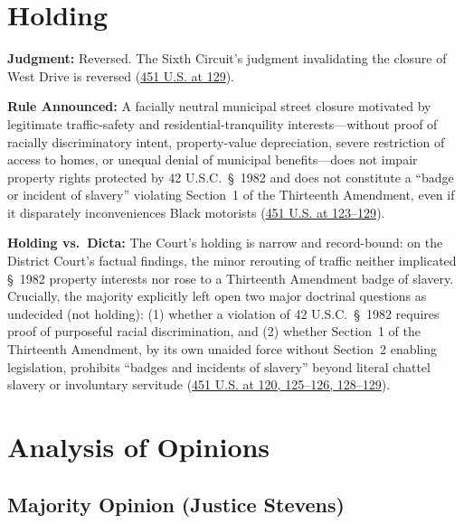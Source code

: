 \documentclass[12pt]{article}
\begin{document}
\section{Holding}

\textbf{Judgment:} Reversed. The Sixth Circuit's judgment invalidating the closure of West Drive is reversed (\href{https://supreme.justia.com/cases/federal/us/451/100/}{451 U.S. at 129}).

\textbf{Rule Announced:} A facially neutral municipal street closure motivated by legitimate traffic-safety and residential-tranquility interests---without proof of racially discriminatory intent, property-value depreciation, severe restriction of access to homes, or unequal denial of municipal benefits---does not impair property rights protected by 42 U.S.C.\ \S~1982 and does not constitute a ``badge or incident of slavery'' violating Section~1 of the Thirteenth Amendment, even if it disparately inconveniences Black motorists (\href{https://supreme.justia.com/cases/federal/us/451/100/}{451 U.S. at 123--129}).

\textbf{Holding vs.\ Dicta:} The Court's holding is narrow and record-bound: on the District Court's factual findings, the minor rerouting of traffic neither implicated \S~1982 property interests nor rose to a Thirteenth Amendment badge of slavery. Crucially, the majority explicitly left open two major doctrinal questions as undecided (not holding): (1) whether a violation of 42 U.S.C.\ \S~1982 requires proof of purposeful racial discrimination, and (2) whether Section~1 of the Thirteenth Amendment, by its own unaided force without Section~2 enabling legislation, prohibits ``badges and incidents of slavery'' beyond literal chattel slavery or involuntary servitude (\href{https://supreme.justia.com/cases/federal/us/451/100/}{451 U.S. at 120, 125--126, 128--129}).

\section{Analysis of Opinions}

\subsection{Majority Opinion (Justice Stevens)}
\end{document}
